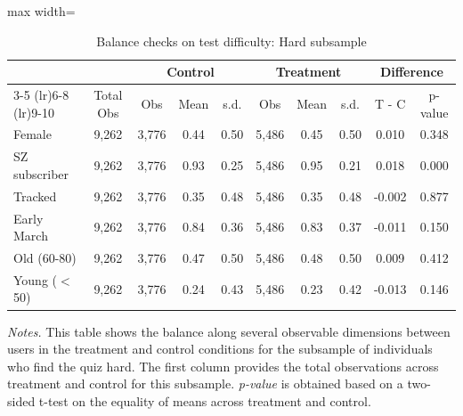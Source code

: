  \begin{table}[H]
 \centering 
 \caption{Balance checks on test difficulty: Hard subsample} 
 \label{tab:balance_hard} 
 \begin{adjustbox}{max width=\textwidth} 
\begin{tabular}{lccccccccc} 
 \toprule
 & & \multicolumn{3}{c}{Control} & \multicolumn{3}{c}{Treatment} & \multicolumn{2}{c}{Difference} \\
 \cmidrule(lr){3-5} \cmidrule(lr){6-8} \cmidrule(lr){9-10} 
 & Total Obs & Obs & Mean & s.d. & Obs & Mean & s.d. & T - C & p-value \\
 \midrule
Female &    9,262 &    3,776 &  0.44 &  0.50 &    5,486 &  0.45 &  0.50 & 0.010 & 0.348 \\
SZ subscriber &    9,262 &    3,776 &  0.93 &  0.25 &    5,486 &  0.95 &  0.21 & 0.018 & 0.000 \\
Tracked &    9,262 &    3,776 &  0.35 &  0.48 &    5,486 &  0.35 &  0.48 & -0.002 & 0.877 \\
Early March &    9,262 &    3,776 &  0.84 &  0.36 &    5,486 &  0.83 &  0.37 & -0.011 & 0.150 \\
Old (60-80) &    9,262 &    3,776 &  0.47 &  0.50 &    5,486 &  0.48 &  0.50 & 0.009 & 0.412 \\
Young ($<$50) &    9,262 &    3,776 &  0.24 &  0.43 &    5,486 &  0.23 &  0.42 & -0.013 & 0.146 \\
 \bottomrule
\end{tabular}
\end{adjustbox}
 \par
 \begin{minipage}{\linewidth}
 \baselineskip9pt {\scriptsize \vspace{0.1cm} {\it Notes.} This table shows the balance along several observable dimensions between users in the treatment and control conditions for the subsample of individuals who find the quiz hard. The first column provides the total observations across treatment and control for this subsample. {\it p-value} is obtained based on a two-sided t-test on the equality of means across treatment and control.}
 \end{minipage}
\end{table}
